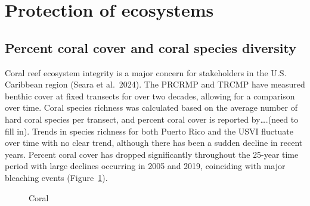 \documentclass[
  letterpaper,
  oneside,
  open=any]{scrbook}
\begin{document}
\section{Protection of ecosystems}\label{protection-of-ecosystems}

\subsection{Percent coral cover and coral species
diversity}\label{percent-coral-cover-and-coral-species-diversity}

Coral reef ecosystem integrity is a major concern for stakeholders in
the U.S. Caribbean region (Seara et al.~2024). The PRCRMP and TRCMP have
measured benthic cover at fixed transects for over two decades, allowing
for a comparison over time. Coral species richness was calculated based
on the average number of hard coral species per transect, and percent
coral cover is reported by\ldots.(need to fill in). Trends in species
richness for both Puerto Rico and the USVI fluctuate over time with no
clear trend, although there has been a sudden decline in recent years.
Percent coral cover has dropped significantly throughout the 25-year
time period with large declines occurring in 2005 and 2019, coinciding
with major bleaching events (Figure~\ref{fig-coral}).

\begin{figure}


\caption{\label{fig-coral}Coral}

\end{figure}%
\end{document}
